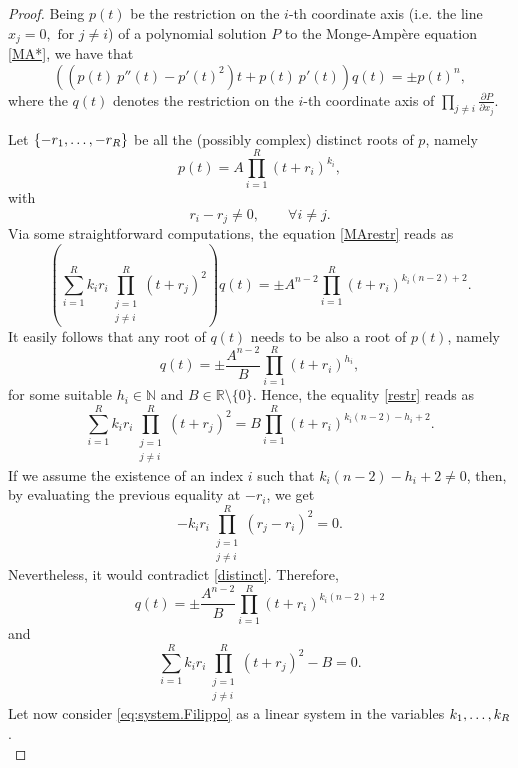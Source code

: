 \documentclass[11pt, reqno]{amsart}
\newcommand{\de}{\partial}
\newcommand{\R}{\mathds{R}}
\newcommand{\N}{\mathds{N}}
\begin{document}
\begin{proof}
Being $p(t)$ be the restriction on the $i$-th coordinate axis (i.e. the line $x_j=0,\text{ for } j\neq i$) of  a  polynomial solution $P$ to the Monge-Amp\`ere equation \eqref{MA*}, we have that
\begin{equation}\label{MArestr}
\left(\left(p(t)\ p''(t)-p'(t)^2\right)t+p(t)\ p'(t)\right) q(t) =\pm p(t)^{n},
\end{equation}
where the $q(t)$ denotes the restriction on the $i$-th coordinate axis of  $\prod_{j\neq i}\frac{\de P}{\de x_j}$.


Let $\{-r_1,\mathellipsis,-r_R\}$ be all the (possibly complex) distinct roots  of  $p$, namely
\begin{equation}\label{p(t)}
p(t)=A\prod_{i=1}^R (t+ r_i)^{k_i},
\end{equation}
with
\begin{equation}\label{distinct}
r_i-r_j\neq 0,\qquad \forall i\neq j.
\end{equation}
Via some straightforward computations, the equation \eqref{MArestr} reads as
\begin{equation}\label{restr}
\left( \sum_{i=1}^R k_i r_i  \prod_{\substack{j=1\\ j\neq i}}^R (t+ r_j)^{2}\right) q(t) =\pm A^{n-2}\prod_{i=1}^R (t+ r_i)^{k_i(n-2)+2}.
\end{equation}
It easily follows that any root of $q(t)$ needs to be  also a root of $p(t)$, namely
$$q(t)=\pm\frac{A^{n-2}}{B} \prod_{i=1}^R (t+ r_i)^{h_i},$$
for some suitable $h_i\in\N$ and $B\in\R\setminus\{0\}$.
Hence, the  equality \eqref{restr} reads as
$$
\sum_{i=1}^R k_i r_i  \prod_{\substack{j=1\\ j\neq i}}^R (t+ r_j)^{2}=B\prod_{i=1}^R (t+ r_i)^{k_i(n-2)-h_i+2}.
$$
%
If  we assume the existence of an index $i$ such that $k_i(n-2)-h_i+2\neq 0$, then, by evaluating the previous equality at $-r_i$, we  get
$$-k_ir_i \prod_{\substack{j=1\\ j\neq i}}^R ( r_j-r_i)^{2}=0.$$
Nevertheless, it would  contradict \eqref{distinct}. Therefore,
\begin{equation}\label{q(t)}
q(t)=\pm\frac{A^{n-2}}{B} \prod_{i=1}^R (t+ r_i)^{k_i(n-2)+2}
\end{equation}
and
\begin{equation}\label{eq:system.Filippo}
 \sum_{i=1}^R k_i r_i  \prod_{\substack{j=1\\ j\neq i}}^R (t+ r_j)^{2}-B=0.
\end{equation}
%
Let now consider \eqref{eq:system.Filippo} as a linear system in the variables $k_1,\mathellipsis,k_R$.\\

\end{proof}
\end{document}
